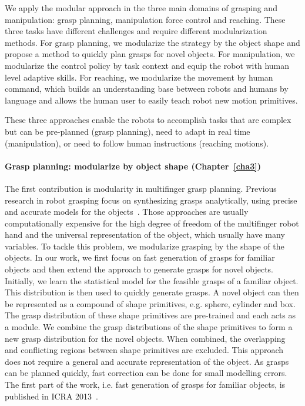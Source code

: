 We apply the modular approach in the three main domains of grasping and manipulation: grasp planning, manipulation force control and reaching. These three tasks have different challenges and require different modularization methods. For grasp planning, we modularize the strategy by the object shape and propose a method to quickly plan grasps for novel objects. For manipulation, we modularize the control policy by task context and equip the robot with human level adaptive skills. For reaching, we modularize the movement by human command, which builds an understanding base between robots and humans by language and allows the human user to easily teach robot new motion primitives.

These three approaches enable the robots to accomplish tasks that are complex but can be pre-planned (grasp planning), need to adapt in real time (manipulation), or need to follow human instructions (reaching motions).



\paragraph{Grasp planning: modularize by object shape (Chapter~\ref{cha3})}
The first contribution is modularity in multifinger grasp planning. Previous research in robot grasping focus on synthesizing grasps analytically, using precise and accurate models for the objects~\citep{sahbani2011overview}. Those approaches are usually computationally expensive for the high degree of freedom of the multifinger robot hand and the universal representation of the object, which usually have many variables. To tackle this problem, we modularize grasping by the shape of the objects. In our work, we first focus on fast generation of grasps for familiar objects and then extend the approach to generate grasps for novel objects.
Initially, we learn the statistical model for the feasible grasps of a familiar object. This distribution is then used to quickly generate grasps. A novel object can then be represented as a compound of shape primitives, e.g. sphere, cylinder and box. The grasp distribution of these shape primitives are pre-trained and each acts as a module. We combine the grasp distributions of the shape primitives to form a new grasp distribution for the novel objects. When combined, the overlapping and conflicting regions between shape primitives are excluded.
This approach does not require a general and accurate representation of the object. As grasps can be planned quickly, fast correction can be done for small modelling errors. The first part of the work, i.e. fast generation of grasps for familiar objects, is published in ICRA 2013~\citep{bidan2013grasp}.


